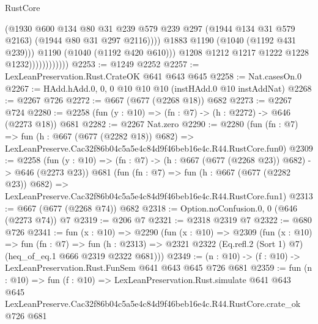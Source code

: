 \begin{lexlean}{RustCore}
\begin{coremodule}
                                    (@1930
                                      @600
                                      @134
                                      @80
                                      @31
                                      @239
                                      @579
                                      @239
                                      @297
                                      (@1944 @134 @31 @579 @2163)
                                      (@1944 @80 @31 @297 @2116))))
                                @1883
                                @1190
                                (@1040 (@1192 @431 @239)))
                              @1190
                              (@1040 (@1192 @420 @610)))
                            @1208
                            @1212
                            @1217
                            @1222
                            @1228
                            @1232))))))))))))
@2253 := @1249 @2252
@2257 := LexLeanPreservation.Rust.CrateOK @641 @643 @645
@2258 := Nat.casesOn.{0}
@2267 := HAdd.hAdd.{0, 0, 0} @10 @10 @10 (instHAdd.{0} @10 instAddNat)
@2268 := @2267 @726
@2272 := @667 (@677 (@2268 @18)) @682
@2273 := @2267 @724
@2280 := @2258 (fun (y : @10) => (fn : @7) -> (h : @2272) -> @646 (@2273 @18)) @681
@2282 := @2267 Nat.zero
@2290 := @2280
    (fun (fn : @7) =>
    fun (h : @667 (@677 (@2282 @18)) @682) =>
    LexLeanPreserve.Cac32f86b04c5a5e4c84d9f46beb16e4c.R44.RustCore.fun0)
@2309 := @2258
    (fun (y : @10) => (fn : @7) -> (h : @667 (@677 (@2268 @23)) @682) -> @646 (@2273 @23))
    @681
    (fun (fn : @7) =>
    fun (h : @667 (@677 (@2282 @23)) @682) =>
    LexLeanPreserve.Cac32f86b04c5a5e4c84d9f46beb16e4c.R44.RustCore.fun1)
@2313 := @667 (@677 (@2268 @74)) @682
@2318 := Option.noConfusion.{0, 0} (@646 (@2273 @74)) @7
@2319 := @206 @7
@2321 := @2318 @2319 @7
@2322 := @680 @726
@2341 := fun (x : @10) =>
  @2290
    (fun (x : @10) =>
    @2309
      (fun (x : @10) =>
      fun (fn : @7) =>
      fun (h : @2313) =>
      @2321 @2322 (Eq.refl.{2} (Sort 1) @7) (heq_of_eq.{1} @666 @2319 @2322 @681)))
@2349 := (n : @10) -> (f : @10) -> LexLeanPreservation.Rust.FunSem @641 @643 @645 @726 @681
@2359 := fun (n : @10) =>
  fun (f : @10) =>
  LexLeanPreservation.Rust.simulate
    @641
    @643
    @645
    LexLeanPreserve.Cac32f86b04c5a5e4c84d9f46beb16e4c.R44.RustCore.crate_ok
    @726
    @681
\end{coremodule}
\end{lexlean}
